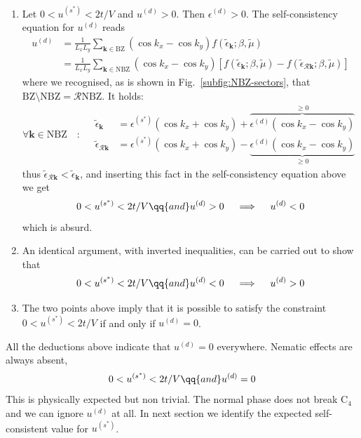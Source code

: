 \begin{enumerate}
	\setcounter{enumi}{\theenumTemp}
	\item Let $0 < u^{(s^*)} < 2t/V$ and $u^{(d)} > 0$. Then $\epsilon^{(d)}>0$. The self-consistency equation for $u^{(d)}$ reads
	\[
	\begin{aligned}
		u^{(d)} &= \frac{1}{L_x L_y} \sum_{\mathbf{k}\in\mathrm{BZ}} (\cos k_x - \cos k_y) f(\tilde{\epsilon}_\mathbf{k};\beta,\tilde{\mu}) \\
		&= \frac{1}{L_x L_y} \sum_{\mathbf{k}\in\mathrm{NBZ}} (\cos k_x - \cos k_y) \left[
		f(\tilde{\epsilon}_\mathbf{k};\beta,\tilde{\mu}) - f(\tilde{\epsilon}_{\mathcal{R}\mathbf{k}};\beta,\tilde{\mu})
		\right]
	\end{aligned}
	\]
	where we recognised, as is shown in Fig.~\ref{subfig:NBZ-sectors}, that $\mathrm{BZ} \setminus \mathrm{NBZ} = \mathcal{R} \mathrm{NBZ}$. It holds:
	\[
	\forall \mathbf{k} \in \mathrm{NBZ}
	\quad\colon\quad
	\begin{aligned}
		\tilde{\epsilon}_\mathbf{k} &= \epsilon^{(s^*)} \left( \cos k_x + \cos k_y \right) + \overbrace{\epsilon^{(d)}  \left( \cos k_x - \cos k_y \right) }^{\ge 0} \\
		\tilde{\epsilon}_{\mathcal{R}\mathbf{k}} &= \epsilon^{(s^*)} \left( \cos k_x + \cos k_y \right) - \underbrace{\epsilon^{(d)}  \left( \cos k_x - \cos k_y \right) }_{\ge 0}
	\end{aligned}
	\]
	thus $\tilde{\epsilon}_{\mathcal{R}\mathbf{k}} < \tilde{\epsilon}_\mathbf{k}$, and inserting this fact in the self-consistency equation above we get
	\[
	0 < u^{(s^*)} < 2t/V
	\qq{and}
	u^{(d)} > 0
	\quad\implies\quad
	u^{(d)} < 0
	\]
	which is absurd.
	\item An identical argument, with inverted inequalities, can be carried out to show that
	\[
	0 < u^{(s^*)} < 2t/V
	\qq{and}
	u^{(d)} < 0
	\quad\implies\quad
	u^{(d)} > 0
	\]
	\item The two points above imply that it is possible to satisfy the constraint $0 < u^{(s^*)} < 2t/V$ if and only if $u^{(d)}=0$.
\end{enumerate}
All the deductions above indicate that $u^{(d)}=0$ everywhere. Nematic effects are always absent, 
\begin{equation}\label{eq:normal-us*-ud-constraint}
	0 < u^{(s^*)} < 2t/V
	\qq{and}
	u^{(d)} = 0
\end{equation}
This is physically expected but non trivial. The normal phase does not break $\mathrm{C}_4$ and we can ignore $u^{(d)}$ at all. In next section we identify the expected self-consistent value for $u^{(s^*)}$.